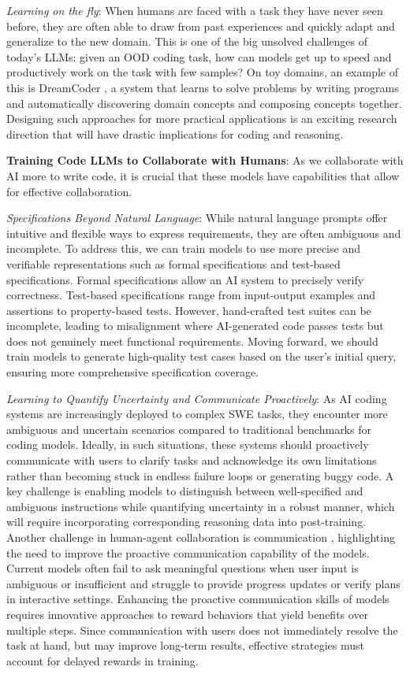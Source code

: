 \textit{Learning on the fly}: When humans are faced with a task they have never seen before, they are often able to draw from past experiences and quickly adapt and generalize to the new domain. This is one of the big unsolved challenges of today's LLMs: given an OOD coding task, how can models get up to speed and productively work on the task with few samples? On toy domains, an example of this is DreamCoder \citep{ellis2021dreamcoder}, a system that learns to solve problems by writing programs and automatically discovering domain concepts and composing concepts together. Designing such approaches for more practical applications is an exciting research direction that will have drastic implications for coding and reasoning.

\textbf{Training Code LLMs to Collaborate with Humans}: As we collaborate with AI more to write code, it is crucial that these models have capabilities that allow for effective collaboration. 

\textit{Specifications Beyond Natural Language}: While natural language prompts offer intuitive and flexible ways to express requirements, they are often ambiguous and incomplete. To address this, we can train models to use more precise and verifiable representations such as formal specifications and test-based specifications. Formal specifications allow an AI system to precisely verify correctness. Test-based specifications range from input-output examples and assertions to property-based tests. However, hand-crafted test suites can be incomplete, leading to misalignment where AI-generated code passes tests but does not genuinely meet functional requirements. Moving forward, we should train models to generate high-quality test cases based on the user's initial query, ensuring more comprehensive specification coverage.

\textit{Learning to Quantify Uncertainty and Communicate Proactively}: As AI coding systems are increasingly deployed to complex SWE tasks, they encounter more ambiguous and uncertain scenarios compared to traditional benchmarks for coding models. Ideally, in such situations, these systems should proactively communicate with users to clarify tasks and acknowledge its own limitations rather than becoming stuck in endless failure loops or generating buggy code. A key challenge is enabling models to distinguish between well-specified and ambiguous instructions while quantifying uncertainty in a robust manner, which will require incorporating corresponding reasoning data into post-training. Another challenge in human-agent collaboration is communication \citep{shao2024collaborativegym}, highlighting the need to improve the proactive communication capability of the models. Current models often fail to ask meaningful questions when user input is ambiguous or insufficient and struggle to provide progress updates or verify plans in interactive settings. Enhancing the proactive communication skills of models requires innovative approaches to reward behaviors that yield benefits over multiple steps. Since communication with users does not immediately resolve the task at hand, but may improve long-term results, effective strategies must account for delayed rewards in training.

